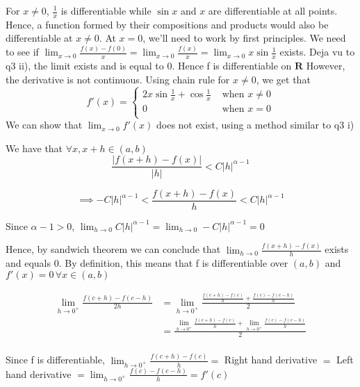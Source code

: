 \documentclass{article}
\begin{document}
\item For $x \neq 0$, $\frac{1}{x}$ is differentiable while $\sin x$ and $x$ are differentiable at all points. Hence, a function formed by their compositions and products would also be differentiable at $x \neq 0$. At $x = 0$, we'll need to work by first principles.
        We need to see if $\lim_{x\to 0} \frac{f(x)-f(0)}{x} = \lim_{x\to 0} \frac{f(x)}{x} = \lim_{x\to 0} x\sin \frac{1}{x}$ exists. Deja vu to q3 ii), the limit exists and is equal to 0. Hence f is differentiable on $\mathbf{R}$
        However, the derivative is not continuous. Using chain rule for $x\neq 0$, we get that 
        $$f'(x) = \begin{cases}
                    2x \sin \frac{1}{x}+ \cos \frac{1}{x} &  \text{ when } x \neq 0\\
                    0 &  \text{ when } x = 0\\
                \end{cases}
                $$
                We can show that $\lim_{x\to 0} f'(x)$ does not exist, using a method similar to q3 i)

        \item We have that $\forall x,x+h \in (a,b)$
                $$\frac{|f(x+h) - f(x)|}{|h|} < C |h|^{\alpha-1}$$

                $$\implies -C|h|^{\alpha-1} < \frac{f(x+h) - f(x)}{h} < C |h|^{\alpha-1}$$

                Since $\alpha -1 > 0$, $\lim_{h \to 0} C|h|^{\alpha-1} = \lim_{h \to 0} -C|h|^{\alpha-1} = 0$

                Hence, by sandwich theorem we can conclude that $\lim_{h\to 0}\frac{f(x+h) - f(x)}{h}$ exists and equals $0$. By definition, this means that f is differentiable over $(a, b)$ and $f'(x) = 0 \, \forall x \in (a,b)$

        \item

                \begin{align*}\lim_{h\to 0^+} \frac{f(c+h) - f(c-h)}{2h} &= \lim_{h\to 0^+}\frac{\frac{f(c+h)-f(c)}{h} + \frac{f(c) - f(c-h)}{h}}{2}\\ 
                                                                       &= \frac{\lim_{h\to 0^+}\frac{f(c+h)-f(c)}{h} + \lim_{h\to 0^+}\frac{f(c) - f(c-h)}{h}}{2}\\
                \end{align*}
               
                Since f is differentiable, $\lim_{h\to 0^+}\frac{f(c+h)-f(c)}{h} = $ Right hand derivative $ = $ Left hand derivative $ = \lim_{h\to 0^+}\frac{f(c) - f(c-h)}{h} = f'(c)$
\end{document}
